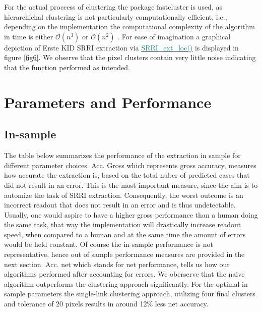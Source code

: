 \documentclass[aodsor,preprint]{imsart}
\numberwithin{equation}{section}
\theoremstyle{plain}
\begin{document}
 For the actual proccess of clustering the package fastcluster is used, as hierarchichal clustering is not particularly computationally efficient, i.e., depending on the implementation the computational complexity of the algorithm in time is either $\mathcal{O}(n^3)$ or $\mathcal{O}(n^2)$ \citep{JSSv053i09, Rok09}. For ease of imagination a graphical depiction of Erste KID SRRI extraction via \href{https://github.com/Base-R-Best-R/KID/blob/main/Code/Package/KIDs/R/SRRI_ext_loc.R}{\textcolor{teal}{SRRI\_ext\_loc()}} is displayed in figure \ref{fig6}. We observe that the pixel clusters contain very little noise indicating that the function performed as intended.


\section{Parameters and Performance} 
\subsection{In-sample}
The table below summarizes the performance of the extraction in sample for different parameter choices. Acc. Gross which represents gross accuracy, measures how accurate the extraction is, based on the total nuber of predicted cases that did not result in an error. This is the most important measure, since the aim is to automize the task of SRRI extraction. Consequently, the worst outcome is an incorrect readout that does not result in an error and is thus undetectable. Usually, one would aspire to have a higher gross performance than a human doing the same task, that way the implementation will drastically increase readout speed, when compared to a human and at the same time the amount of errors would be held constant. Of course the in-sample performance is not representative, hence out of sample performance measures are provided in the next section. Acc. net which stands for net performance, tells us how our algorithms performed after accounting for errors. We oberserve that the naive algorithm outperforms the clustering approach significantly. For the optimal in-sample parameters the single-link clustering approach, utilizing four final clusters and tolerance of 20 pixels results in around 12\% less net accuracy.
\end{document}
